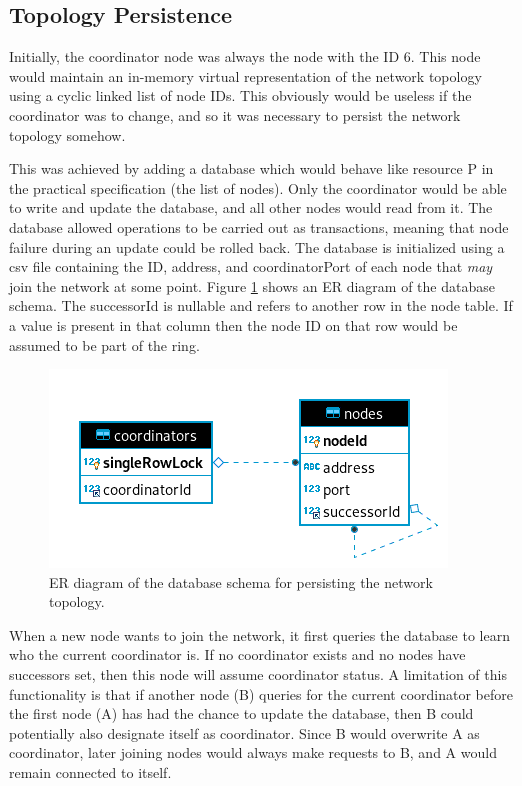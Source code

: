 \documentclass[12pt]{article}
\begin{document}
\subsection{Topology Persistence}

Initially, the coordinator node was always the node with the ID 6. This node would maintain an in-memory virtual representation of the network topology using a cyclic linked list of node IDs. This obviously would be useless if the coordinator was to change, and so it was necessary to persist the network topology somehow. 

This was achieved by adding a database which would behave like resource P in the practical specification (the list of nodes). Only the coordinator would be able to write and update the database, and all other nodes would read from it. The database allowed operations to be carried out as transactions, meaning that node failure during an update could be rolled back. The database is initialized using a csv file containing the ID, address, and coordinatorPort of each node that \emph{may} join the network at some point. Figure \ref{fig:er} shows an ER diagram of the database schema. The successorId is nullable and refers to another row in the node table. If a value is present in that column then the node ID on that row would be assumed to be part of the ring.

\begin{figure}[!ht]
	\centering
	\includegraphics[width=0.6\linewidth]{images/er}
	\caption{ER diagram of the database schema for persisting the network topology.}
	\label{fig:er}
\end{figure}

When a new node wants to join the network, it first queries the database to learn who the current coordinator is. If no coordinator exists and no nodes have successors set, then this node will assume coordinator status. A limitation of this functionality is that if another node (B) queries for the current coordinator before the first node (A) has had the chance to update the database, then B could potentially also designate itself as coordinator. Since B would overwrite A as coordinator, later joining nodes would always make requests to B, and A would remain connected to itself.
\end{document}
